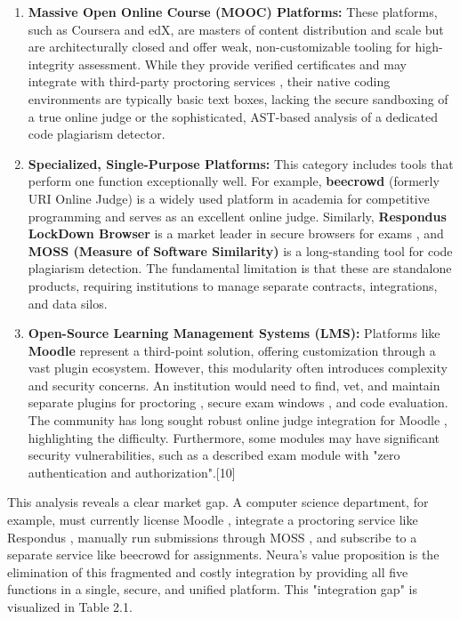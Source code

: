 \begin{enumerate}
    \item \textbf{Massive Open Online Course (MOOC) Platforms:} These platforms, such as Coursera and edX, are masters of content distribution and scale but are architecturally closed and offer weak, non-customizable tooling for high-integrity assessment.\cite{coursera, edx} While they provide verified certificates and may integrate with third-party proctoring services \cite{coursera}, their native coding environments are typically basic text boxes, lacking the secure sandboxing of a true online judge or the sophisticated, AST-based analysis of a dedicated code plagiarism detector.

    \item \textbf{Specialized, Single-Purpose Platforms:} This category includes tools that perform one function exceptionally well. For example, \textbf{beecrowd} (formerly URI Online Judge) is a widely used platform in academia for competitive programming and serves as an excellent online judge.\cite{beecrowd} Similarly, \textbf{Respondus LockDown Browser} is a market leader in secure browsers for exams \cite{respondus}, and \textbf{MOSS (Measure of Software Similarity)} is a long-standing tool for code plagiarism detection.\cite{aikenMOSS} The fundamental limitation is that these are standalone products, requiring institutions to manage separate contracts, integrations, and data silos.

    \item \textbf{Open-Source Learning Management Systems (LMS):} Platforms like \textbf{Moodle} represent a third-point solution, offering customization through a vast plugin ecosystem.\cite{moodle} However, this modularity often introduces complexity and security concerns. An institution would need to find, vet, and maintain separate plugins for proctoring \cite{moodle, moodle_plugins}, secure exam windows \cite{moodle_plugins}, and code evaluation. The community has long sought robust online judge integration for Moodle \cite{moodle_judge}, highlighting the difficulty. Furthermore, some modules may have significant security vulnerabilities, such as a described exam module with "zero authentication and authorization".[10]
\end{enumerate}

This analysis reveals a clear market gap. A computer science department, for example, must currently license Moodle \cite{moodle}, integrate a proctoring service like Respondus \cite{respondus}, manually run submissions through MOSS \cite{aikenMOSS}, and subscribe to a separate service like beecrowd \cite{beecrowd} for assignments. Neura's value proposition is the elimination of this fragmented and costly integration by providing all five functions in a single, secure, and unified platform. This "integration gap" is visualized in Table 2.1.

